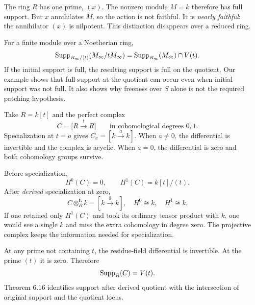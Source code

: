 The ring $R$ has one prime, $(x)$. The nonzero module $M=k$ therefore has full support. But $x$ annihilates $M$, so the action is not faithful. It is \emph{nearly faithful}: the annihilator $(x)$ is nilpotent. This distinction disappears over a reduced ring.

For a finite module over a Noetherian ring,
\[
\operatorname{Supp}_{R_\infty/(t)}(M_\infty/tM_\infty)
=\operatorname{Supp}_{R_\infty}(M_\infty)\cap V(t).
\]
If the initial support is full, the resulting support is full on the quotient. Our example shows that full support at the quotient can occur even when initial support was not full. It also shows why freeness over $S$ alone is not the required patching hypothesis.


Take $R=k[t]$ and the perfect complex
\[
C=\bigl[R\xrightarrow{\;t\;}R\bigr]
\qquad\text{in cohomological degrees }0,1.
\]
Specialization at $t=a$ gives $C_a=[k\xrightarrow{a}k]$. When $a\ne0$, the differential is invertible and the complex is acyclic. When $a=0$, the differential is zero and both cohomology groups survive.


Before specialization,
\[
H^0(C)=0,\qquad H^1(C)=k[t]/(t).
\]
After \emph{derived} specialization at zero,
\[
C\otimes_R^{\mathbf L}k=[k\xrightarrow{0}k],
\quad H^0\cong k,\quad H^1\cong k.
\]
If one retained only $H^1(C)$ and took its ordinary tensor product with $k$, one would see a single $k$ and miss the extra cohomology in degree zero. The projective complex keeps the information needed for specialization.

At any prime not containing $t$, the residue-field differential is invertible. At the prime $(t)$ it is zero. Therefore
\[
\operatorname{Supp}_R(C)=V(t).
\]
Theorem 6.16 identifies support after derived quotient with the intersection of original support and the quotient locus.

